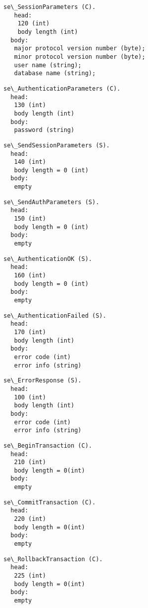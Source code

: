 \documentclass[a4paper,12pt]{article}
\begin{document}
\begin{verbatim}
se\_SessionParameters (C).
   head:
    120 (int)
    body length (int)
  body:
   major protocol version number (byte);
   minor protocol version number (byte);
   user name (string);
   database name (string);
\end{verbatim}   

\begin{verbatim}
se\_AuthenticationParameters (C).
  head:
   130 (int)
   body length (int)
  body:
   password (string)
\end{verbatim}   

\begin{verbatim}
se\_SendSessionParameters (S).
  head:
   140 (int)
   body length = 0 (int)
  body:
   empty 
\end{verbatim}
   
\begin{verbatim}
se\_SendAuthParameters (S).
  head:
   150 (int)
   body length = 0 (int)
  body:
   empty
\end{verbatim}   
  
\begin{verbatim}  
se\_AuthenticationOK (S).
  head:
   160 (int)
   body length = 0 (int)
  body:
   empty
\end{verbatim}   

\begin{verbatim}
se\_AuthenticationFailed (S).
  head:
   170 (int)
   body length (int)
  body:
   error code (int)
   error info (string)
\end{verbatim}

\begin{verbatim}
se\_ErrorResponse (S).
  head:
   100 (int)
   body length (int)
  body:
   error code (int)
   error info (string)
\end{verbatim}   

\begin{verbatim}
se\_BeginTransaction (C).
  head:
   210 (int)
   body length = 0(int)
  body:
   empty
\end{verbatim}   

\begin{verbatim}
se\_CommitTransaction (C).
  head:
   220 (int)
   body length = 0(int)
  body:
   empty
\end{verbatim}   

\begin{verbatim}
se\_RollbackTransaction (C).
  head:
   225 (int)
   body length = 0(int)
  body:
   empty
\end{verbatim}   
\end{document}
